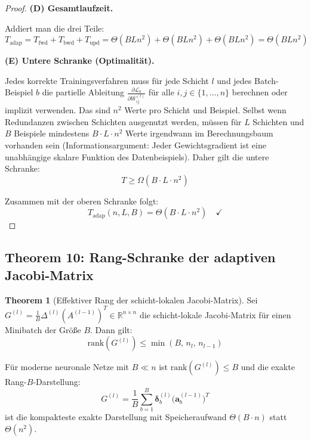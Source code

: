 ﻿\documentclass[a4paper,12pt]{article}
\theoremstyle{definition}
\newtheorem{theorem}{Theorem}
\begin{document}
\begin{proof}
	\medskip
	\textbf{(D) Gesamtlaufzeit.}
	
	Addiert man die drei Teile:
	\[
	T_{\mathrm{adap}} = T_{\mathrm{fwd}} + T_{\mathrm{bwd}} + T_{\mathrm{upd}} = \Theta(BLn^2) + \Theta(BLn^2) + \Theta(BLn^2) = \Theta(BLn^2)
	\]
	
	\medskip
	\textbf{(E) Untere Schranke (Optimalität).}
	
	Jedes korrekte Trainingsverfahren muss für jede Schicht $l$ und jedes Batch-Beispiel $b$ die partielle Ableitung $\frac{\partial \mathcal{L}_b}{\partial W^{(l)}_{ij}}$ für alle $i, j \in \{1, \ldots, n\}$ berechnen oder implizit verwenden. Das sind $n^2$ Werte pro Schicht und Beispiel. Selbst wenn Redundanzen zwischen Schichten ausgenutzt werden, müssen für $L$ Schichten und $B$ Beispiele mindestens $B \cdot L \cdot n^2$ Werte irgendwann im Berechnungsbaum vorhanden sein (Informationsargument: Jeder Gewichtsgradient ist eine unabhängige skalare Funktion des Datenbeispiels). Daher gilt die untere Schranke:
	\[
	T \geq \Omega(B \cdot L \cdot n^2)
	\]
	
	Zusammen mit der oberen Schranke folgt:
	\[
	T_{\mathrm{adap}}(n, L, B) = \Theta(B \cdot L \cdot n^2) \quad \checkmark
	\]
\end{proof}

\subsection{Theorem 10: Rang-Schranke der adaptiven Jacobi-Matrix}

\begin{theorem}[Effektiver Rang der schicht-lokalen Jacobi-Matrix]
	\label{thm:rank_bound}
	Sei $G^{(l)} = \frac{1}{B} \Delta^{(l)} (A^{(l-1)})^T \in \mathbb{R}^{n \times n}$ die schicht-lokale Jacobi-Matrix für einen Minibatch der Größe $B$. Dann gilt:
	\[
	\mathrm{rank}(G^{(l)}) \leq \min(B,\, n_l,\, n_{l-1})
	\]
	
	Für moderne neuronale Netze mit $B \ll n$ ist $\mathrm{rank}(G^{(l)}) \leq B$ und die exakte Rang-$B$-Darstellung:
	\[
	G^{(l)} = \frac{1}{B} \sum_{b=1}^B \boldsymbol{\delta}^{(l)}_b \bigl(\boldsymbol{a}^{(l-1)}_b\bigr)^T
	\]
	ist die kompakteste exakte Darstellung mit Speicheraufwand $\Theta(B \cdot n)$ statt $\Theta(n^2)$.
\end{theorem}
\end{document}
